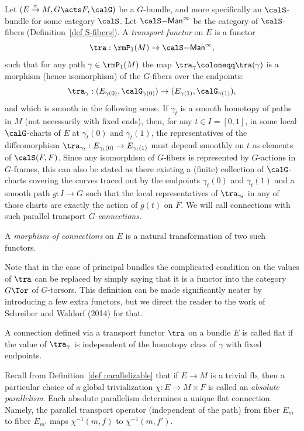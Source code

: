 \begin{defn}
    Let $(E\overset{\pi}{\to}M,G\acts F,\calG)$ be a $G$-bundle, and more specifically an $\calS$-bundle for some category $\calS$. Let $\calS\mathsf{-Man}^\infty$ be the category of $\calS$-fibers (Definition~\ref{def S-fibers}). A \emph{transport functor} on $E$ is a functor
    \[\tra: \rmP_1(M)\to \calS\mathsf{-Man}^\infty,\]
    such that for any path $\gamma\in\rmP_1(M)$ the map $\tra_\gamma\coloneqq \tra(\gamma)$ is a morphism (hence isomorphism) of the $G$-fibers over the endpoints:
    \[\tra_\gamma:(E_{\gamma(0)},\calG_{\gamma(0)})\to (E_{\gamma(1)},\calG_{\gamma(1)}),\]
    and which is smooth in the following sense. If $\gamma_t$ is a smooth homotopy of paths in $M$ (not necessarily with fixed ends), then, for any $t\in I=[0,1]$, in some local $\calG$-charts of $E$ at $\gamma_t(0)$ and $\gamma_t(1)$, the representatives of the diffeomorphism $\tra_{\gamma_t}:E_{\gamma_t(0)}\to E_{\gamma_t(1)}$ must depend smoothly on $t$ as elements of $\calS(F,F)$. Since any isomorphism of $G$-fibers is represented by $G$-actions in $G$-frames, this can also be stated as there existing a (finite) collection of $\calG$-charts covering the curves traced out by the endpoints $\gamma_t(0)$ and $\gamma_t(1)$ and a smooth path $g:I\to G$ such that the local representatives of $\tra_{\gamma_t}$ in any of those charts are exactly the action of $g(t)$ on $F$. We will call connections with such parallel transport \emph{$G$-connections}.

    A \emph{morphism of connections} on $E$ is a natural transformation of two such functors.
\end{defn}

Note that in the case of principal bundles the complicated condition on the values of $\tra$ can be replaced by simply saying that it is a functor into the category $G\Tor$ of $G$-torsors. This definition can be made significantly neater by introducing a few extra functors, but we direct the reader to the work of Schreiber and Waldorf (2014) for that.

\begin{defn}
    A connection defined via a transport functor $\tra$ on a bundle $E$ is called flat if the value of $\tra_\gamma$ is independent of the homotopy class of $\gamma$ with fixed endpoints.
\end{defn}


\begin{example}
    Recall from Definition~\ref{def parallelizable} that if $E\to M$ is a trivial \gls{fb}, then a particular choice of a global trivialization $\chi:E\to M\times F$ is called an \emph{absolute parallelism}. Each absolute parallelism determines a unique flat connection. Namely, the parallel transport operator (independent of the path) from fiber $E_m$ to fiber $E_{m'}$ maps $\chi^{-1}(m,f)$ to $\chi^{-1}(m,f')$.
\end{example}

